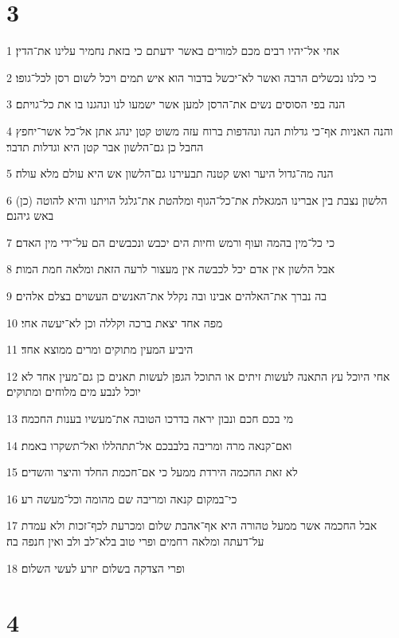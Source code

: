 \chapter{3}

\par 1 אחי אל־יהיו רבים מכם למורים באשר ידעתם כי בזאת נחמיר עלינו את־הדין׃
\par 2 כי כלנו נכשלים הרבה ואשר לא־יכשל בדבור הוא איש תמים ויכל לשום רסן לכל־גופו׃
\par 3 הנה בפי הסוסים נשים את־הרסן למען אשר ישמעו לנו ונהגנו בו את כל־גויתם׃
\par 4 והנה האניות אף־כי גדלות הנה ונהדפות ברוח עזה משוט קטן ינהג אתן אל־כל אשר־יחפץ החבל כן גם־הלשון אבר קטן היא וגדלות תדבר׃
\par 5 הנה מה־גדול היער ואש קטנה תבעירנו גם־הלשון אש היא עולם מלא עולה׃
\par 6 (כן) הלשון נצבת בין אברינו המגאלת את־כל־הגוף ומלהטת את־גלגל הויתנו והיא להוטה באש גיהנם׃
\par 7 כי כל־מין בהמה ועוף ורמש וחיות הים יכבש ונכבשים הם על־ידי מין האדם׃
\par 8 אבל הלשון אין אדם יכל לכבשה אין מעצור לרעה הזאת ומלאה חמת המות׃
\par 9 בה נברך את־האלהים אבינו ובה נקלל את־האנשים העשוים בצלם אלהים׃
\par 10 מפה אחד יצאת ברכה וקללה וכן לא־יעשה אחי׃
\par 11 היביע המעין מתוקים ומרים ממוצא אחד׃
\par 12 אחי היוכל עץ התאנה לעשות זיתים או התוכל הגפן לעשות תאנים כן גם־מעין אחד לא יוכל לנבע מים מלוחים ומתוקים׃
\par 13 מי בכם חכם ונבון יראה בדרכו הטובה את־מעשיו בענות החכמה׃
\par 14 ואם־קנאה מרה ומריבה בלבבכם אל־תתהללו ואל־תשקרו באמת׃
\par 15 לא זאת החכמה הירדת ממעל כי אם־חכמת החלד והיצר והשדים׃
\par 16 כי־במקום קנאה ומריבה שם מהומה וכל־מעשה רע׃
\par 17 אבל החכמה אשר ממעל טהורה היא אף־אהבת שלום ומכרעת לכף־זכות ולא עמדת על־דעתה ומלאה רחמים ופרי טוב בלא־לב ולב ואין חנפה בה׃
\par 18 ופרי הצדקה בשלום יזרע לעשי השלום׃

\chapter{4}

